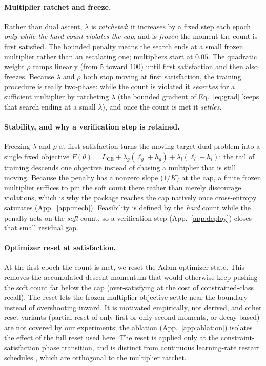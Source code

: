 \documentclass[10pt]{article}
\begin{document}
\paragraph{Multiplier ratchet and freeze.}
Rather than dual ascent, $\lambda$ is \emph{ratcheted}: it increases by a
fixed step each epoch \emph{only while the hard count violates the cap}, and
is \emph{frozen} the moment the count is first satisfied. The bounded
penalty means the search ends at a small frozen multiplier rather than an
escalating one; multipliers start at $0.05$. The quadratic weight $\rho$
ramps linearly (from $5$ toward $100$) until first satisfaction and then
also freezes. Because $\lambda$ and $\rho$ both stop moving at first
satisfaction, the training procedure is really two-phase: while the count
is violated it \emph{searches} for a sufficient multiplier by ratcheting
$\lambda$ (the bounded gradient of Eq.~\eqref{eq:grad} keeps that search
ending at a small $\lambda$), and once the count is met it \emph{settles}.

\paragraph{Stability, and why a verification step is retained.}
Freezing $\lambda$ and $\rho$ at first satisfaction turns the moving-target
dual problem into a single fixed objective
$F(\theta)=L_{\text{CE}}+\lambda_g(\ell_g{+}h_g)+\lambda_l(\ell_l{+}h_l)$:
the tail of training descends one objective instead of chasing a multiplier
that is still moving. Because the penalty has a nonzero slope ($1/K$) at the
cap, a finite frozen multiplier suffices to pin the soft count there rather
than merely discourage violations, which is why the package reaches the cap
natively once cross-entropy saturates (App.~\ref{app:mech}). Feasibility is
defined by the \emph{hard} count while the penalty acts on the \emph{soft}
count, so a verification step (App.~\ref{app:deploy}) closes that small
residual gap.

\paragraph{Optimizer reset at satisfaction.}
At the first epoch the count is met, we reset the Adam optimizer state. This
removes the accumulated descent momentum that would otherwise keep pushing
the soft count far below the cap (over-satisfying at the cost of
constrained-class recall). The reset lets the frozen-multiplier objective
settle near the boundary instead of overshooting inward. It is motivated
empirically, not derived, and other reset variants (partial reset of only
first or only second moments, or decay-based) are not covered by our
experiments; the ablation (App.~\ref{app:ablation}) isolates the effect of
the full reset used here. The reset is applied only at the
constraint-satisfaction phase transition, and is distinct from continuous
learning-rate restart schedules \citep{loshchilov2017sgdr}, which are
orthogonal to the multiplier ratchet.
\end{document}
